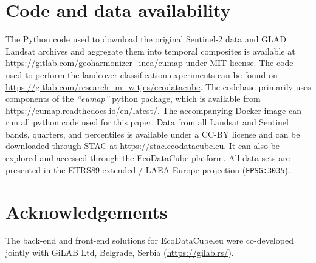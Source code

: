 \section*{Code and data availability}
The Python code used to download the original Sentinel-2 data and GLAD Landsat archives and aggregate them into temporal composites is available at \url{https://gitlab.com/geoharmonizer\_inea/eumap} under MIT license. The code used to perform the landcover classification experiments can be found on \url{https://gitlab.com/research_m_witjes/ecodatacube}. The codebase primarily uses components of the \emph{``eumap''} python package, which is available from \url{https://eumap.readthedocs.io/en/latest/}. The accompanying Docker image can run all python code used for this paper. Data from all Landsat and Sentinel bands, quarters, and percentiles is available under a CC-BY license and can be downloaded through STAC at \url{https://stac.ecodatacube.eu}. It can also be explored and accessed through the EcoDataCube platform. All data sets are presented in the ETRS89-extended / LAEA Europe projection (\texttt{EPSG:3035}).

\section*{Acknowledgements}
The back-end and front-end solutions for EcoDataCube.eu were co-developed jointly with GiLAB Ltd, Belgrade, Serbia (\url{https://gilab.rs/}).